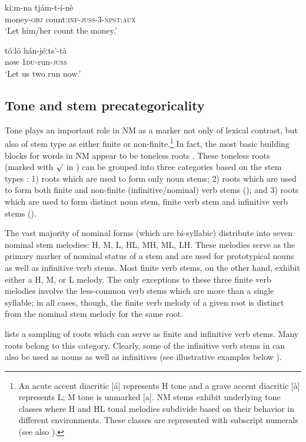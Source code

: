 \documentclass[output=paper]{langsci/langscibook}
\begin{document}
\ea\label{ex:mahland:14}
\gll kiːm-na        tjám-t-í-nè\\
money-\textsc{obj}   count:\textsc{inf-juss-3-npst:aux}\\
\glt `Let him/her count the money.'
\z

\ea\label{ex:mahland:15}
\gll tóːló    hán-jéːts'-tà  \\
now    \textsc{1du}{}-run\textsc{{}-juss}\\
\glt `Let us two run now.' 

\subsection{Tone and stem precategoricality}\label{sec:mahland:1.3}

Tone plays an important role in NM as a marker not only of lexical contrast, but also of stem type as either finite or non-finite.\footnote{An acute accent diacritic [á] represents H tone and a grave accent diacritic [à] represents L; M tone is unmarked [a]. NM stems exhibit underlying tone classes where H and HL tonal melodies subdivide based on their behavior in different environments. These classes are represented with subscript numerals (see also \citealt[146]{Ahland2012}).} In fact, the most basic building blocks for words in NM appear to be toneless roots \citet[182]{Ahland2012}. These toneless roots (marked with ${\surd}$ in ) can be grouped into three categories based on the stem types \citep{Ahland2014a}: 1) roots which are used to form only noun stems; 2) roots which are used to form both finite and non-finite (infinitive/nominal) verb stems (); and 3) roots which are used to form distinct noun stem, finite verb stem and infinitive verb stems (). 

The vast majority of nominal forms (which are bi-syllabic) distribute into seven nominal stem melodies: H, M, L, HL, MH, ML, LH. These melodies serve as the primary marker of nominal status of a stem and are used for prototypical nouns as well as infinitive verb stems. Most finite verb stems, on the other hand, exhibit either a H, M, or L melody. The only exceptions to these three finite verb melodies involve the less-common verb stems which are more than a single syllable; in all cases, though, the finite verb melody of a given root is distinct from the nominal stem melody for the same root. 

 lists a sampling of roots which can serve as finite and infinitive verb  stems. Many roots belong to this category. Clearly, some of the infinitive verb stems in  can also be used as nouns as well as infinitives (see illustrative examples below ). 
\end{document}
